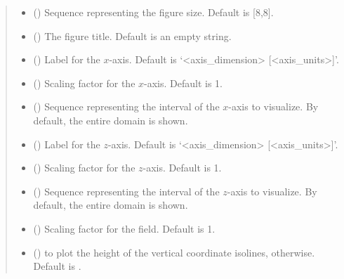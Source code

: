 \documentclass[letterpaper,10pt,english]{sphinxmanual}
\begin{document}
\begin{fulllineitems}
\begin{quote}
\begin{description}
\begin{itemize}
\item {} 
 () \textendash{} Sequence representing the figure size. Default is {[}8,8{]}.

\item {} 
 () \textendash{} The figure title. Default is an empty string.

\item {} 
 () \textendash{} Label for the \(x\)-axis. Default is ‘\textless{}axis\_dimension\textgreater{} {[}\textless{}axis\_units\textgreater{}{]}’.

\item {} 
 () \textendash{} Scaling factor for the \(x\)-axis. Default is 1.

\item {} 
 () \textendash{} Sequence representing the interval of the \(x\)-axis to visualize. By default, the entire domain is shown.

\item {} 
 () \textendash{} Label for the \(z\)-axis. Default is ‘\textless{}axis\_dimension\textgreater{} {[}\textless{}axis\_units\textgreater{}{]}’.

\item {} 
 () \textendash{} Scaling factor for the \(z\)-axis. Default is 1.

\item {} 
 () \textendash{} Sequence representing the interval of the \(z\)-axis to visualize. By default, the entire domain is shown.

\item {} 
 () \textendash{} Scaling factor for the field. Default is 1.

\item {} 
 () \textendash{}  to plot the height of the vertical coordinate isolines,  otherwise. Default is .


\end{itemize}
\end{description}
\end{quote}
\end{fulllineitems}
\end{document}
